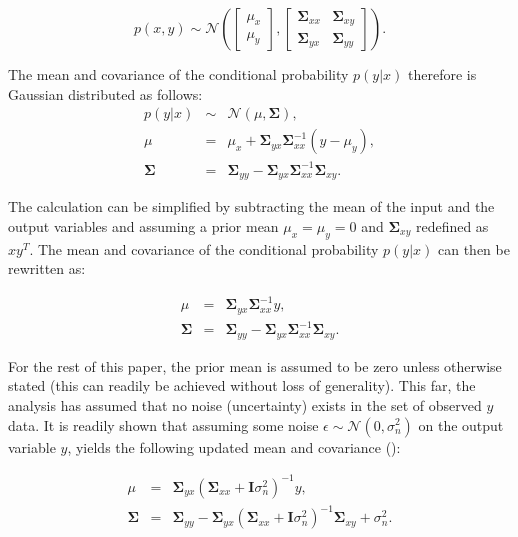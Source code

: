\documentclass[useAMS,usenatbib,fleqn]{mn2e}
\newcommand{\bm}[1]{\mathbf{#1} }
\begin{document}
\begin{equation}
p\left ( x,y\right) \sim \mathcal{N} \left ( \begin{bmatrix}\mu_{x}\\\mu_{y} \end{bmatrix}, \begin{bmatrix}\bm{\Sigma}_{xx} & \bm{\Sigma}_{xy}\\\bm{\Sigma}_{yx} & \bm{\Sigma}_{yy} \end{bmatrix}\right ).
\end{equation}

The mean and covariance of the conditional probability $p(y|x)$ therefore is Gaussian distributed as follows:
\begin{equation}
\begin{array}{rcl}
p(y|x)		&	\sim		&	\mathcal{N} \left ( \mu, \bm{\Sigma} \right ),\\
\mu			&	=		&	\mu_{x}+\bm{\Sigma}_{yx}\bm{\Sigma}_{xx}^{-1}\left ( y-\mu_{y}\right ),\\
\bm{\Sigma}		&	=		&	\bm{\Sigma}_{yy}-\bm{\Sigma}_{yx}\bm{\Sigma}_{xx}^{-1}\bm{\Sigma}_{xy}.
\end{array}
\end{equation}

The calculation can be simplified by subtracting the mean of the input and the output variables and assuming a prior mean $\mu_{x}=\mu_{y}=0$ and $\bm{\Sigma}_{xy}$ redefined as $xy^{T}$. The mean and covariance of the conditional probability $p(y|x)$ can then be rewritten as:

\begin{equation}
\label{eq-conditional-zero-mean}
\begin{array}{rcl}
\mu 		&=&		\bm{\Sigma}_{yx}\bm{\Sigma}_{xx}^{-1}y,\\
\bm{\Sigma} 	&=& 	\bm{\Sigma}_{yy}-\bm{\Sigma}_{yx}\bm{\Sigma}_{xx}^{-1}\bm{\Sigma}_{xy}.
\end{array}
\end{equation}

For the rest of this paper, the prior mean is assumed to be zero unless otherwise stated (this can readily be achieved without loss of generality). This far, the analysis has assumed that no noise (uncertainty) exists in the set of observed $y$ data. It is readily shown that assuming some noise $\epsilon \sim \mathcal{N}\left(0,\sigma_{n}^{2}\right)$ on the output variable $y$, yields the following updated mean and covariance (\citep{rasmussen2006gaussian}):

\begin{equation}
\label{eq-mean-variance-noise}
\begin{array}{rcl}
\mu &=& \bm{\Sigma}_{yx}\left(\bm{\Sigma}_{xx}+\bm{I}\sigma_{n}^{2}\right)^{-1}y,\\
\bm{\Sigma} &=& \bm{\Sigma}_{yy}-\bm{\Sigma}_{yx}\left(\bm{\Sigma}_{xx}+\bm{I}\sigma_{n}^{2}\right)^{-1}\bm{\Sigma}_{xy}+\sigma_{n}^{2}.
\end{array}
\end{equation}
\end{document}

